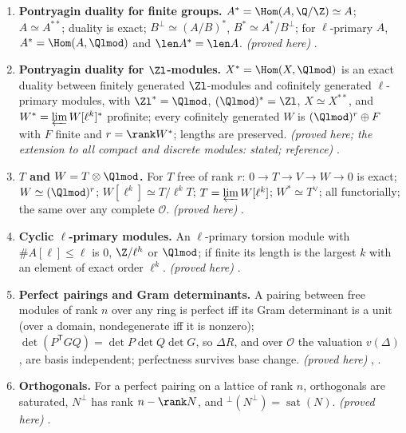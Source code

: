 \begin{enumerate}[label=\textbf{\thechapter.\arabic*}]
$\Fitt(M)=\varpi^{\len M}\mathcal O$ for torsion $M$, so $\Fitt_{\Zl}(M)=\#M\cdot\Zl$, multiplicative in exact sequences; $\Fitt_{\Zl}(\Z/\ell^v\oplus\Z/\ell^m)=\ell^{v+m}\Zl$, while
$\Ann=\ell^{\max(v,m)}\Zl$. \emph{(proved here)} , .
\item \textbf{Pontryagin duality for finite groups.} $A^*=\Hom(A,\Q/\Z)\simeq A$; $A\simeq A^{**}$; duality is exact; $B^\perp\simeq(A/B)^*$, $B^*\simeq A^*/B^\perp$; for $\ell$-primary $A$,
$A^*=\Hom(A,\Qlmod)$ and $\len A^*=\len A$. \emph{(proved here)} .
\item \textbf{Pontryagin duality for $\Zl$-modules.} $X^*=\Hom(X,\Qlmod)$ is an exact duality between finitely generated $\Zl$-modules and cofinitely generated $\ell$-primary
modules, with $\Zl^*=\Qlmod$, $(\Qlmod)^*=\Zl$, $X\simeq X^{**}$, and $W^*=\varprojlim W[\ell^k]^*$ profinite; every cofinitely generated $W$ is $(\Qlmod)^r\oplus F$ with $F$ finite and $r=\rank W^*$; lengths are preserved.
\emph{(proved here; the extension to all compact and discrete modules: stated; reference)} .
\item \textbf{$T$ and $W=T\otimes\Qlmod$.} For $T$ free of rank $r$: $0\to T\to V\to W\to0$ is exact; $W\simeq(\Qlmod)^r$; $W[\ell^k]\simeq T/\ell^kT$; $T=\varprojlim W[\ell^k]$; $W^*\simeq T^\vee$;
all functorially; the same over any complete $\mathcal O$. \emph{(proved here)} .
\item \textbf{Cyclic $\ell$-primary modules.} An $\ell$-primary torsion module with $\#A[\ell]\le\ell$ is $0$, $\Z/\ell^h$ or $\Qlmod$; if finite its length is the largest $k$ with
an element of exact order $\ell^k$. \emph{(proved here)} .
\item \textbf{Perfect pairings and Gram determinants.} A pairing between free modules of rank $n$ over any ring is perfect iff its Gram determinant is a unit (over a domain, nondegenerate iff it is nonzero); $\det(P^{\mathsf T}GQ)=\det P\det Q\det G$,
so $\Delta R$, and over $\mathcal O$ the valuation $v(\Delta)$, are basis independent; perfectness survives base change. \emph{(proved here)} ,
.
\item \textbf{Orthogonals.} For a perfect pairing on a lattice of rank $n$, orthogonals are saturated, $N^\perp$ has rank $n-\rank N$, and ${}^\perp(N^\perp)=\operatorname{sat}(N)$.
\emph{(proved here)} .

\end{enumerate}
